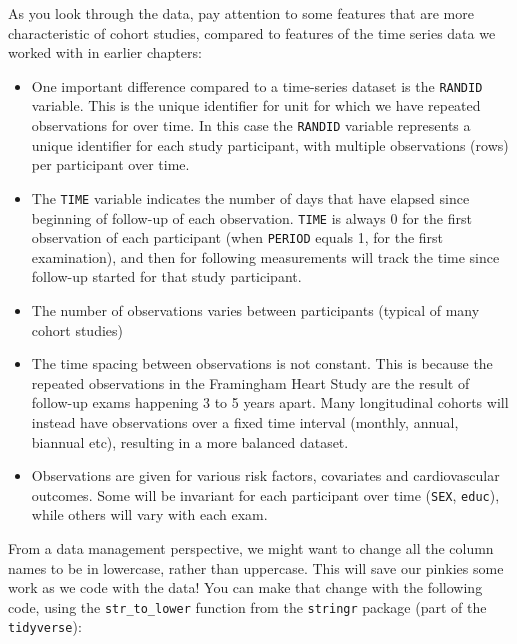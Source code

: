 \documentclass[
]{book}
\newenvironment{Shaded}{\begin{snugshade}}{\end{snugshade}}
\newcommand{\DataTypeTok}[1]{\textcolor[rgb]{0.13,0.29,0.53}{#1}}
\newcommand{\KeywordTok}[1]{\textcolor[rgb]{0.13,0.29,0.53}{\textbf{#1}}}
\newcommand{\NormalTok}[1]{#1}
\newcommand{\OperatorTok}[1]{\textcolor[rgb]{0.81,0.36,0.00}{\textbf{#1}}}
\newcommand{\StringTok}[1]{\textcolor[rgb]{0.31,0.60,0.02}{#1}}
\providecommand{\tightlist}{%
  \setlength{\itemsep}{0pt}\setlength{\parskip}{0pt}}
\begin{document}
As you look through the data, pay attention to some features that are more characteristic of cohort studies, compared to features of the time series data we worked with in earlier chapters:

\begin{itemize}
\tightlist
\item
  One important difference compared to a time-series dataset is the \texttt{RANDID} variable. This is the unique identifier for unit for which we have repeated observations for over time.
  In this case the \texttt{RANDID} variable represents a unique identifier for each study participant, with multiple observations (rows) per participant over time.
\item
  The \texttt{TIME} variable indicates the number of days that have elapsed since beginning of follow-up of each observation. \texttt{TIME} is always 0 for the first observation of each participant (when \texttt{PERIOD} equals 1, for the first examination), and then for following measurements will track the time since follow-up started for that study participant.
\item
  The number of observations varies between participants (typical of many cohort studies)
\item
  The time spacing between observations is not constant. This is because the repeated observations in the Framingham Heart Study are the result of follow-up exams happening 3 to 5 years apart. Many longitudinal cohorts will instead have observations over a fixed time interval (monthly, annual, biannual etc), resulting in a more balanced dataset.
\item
  Observations are given for various risk factors, covariates and cardiovascular outcomes. Some will be invariant for each participant over time (\texttt{SEX}, \texttt{educ}), while others will vary with each exam.
\end{itemize}

From a data management perspective, we might want to change all the column names
to be in lowercase, rather than uppercase. This will save our pinkies some
work as we code with the data! You can make that change with the following
code, using the \texttt{str\_to\_lower} function from the \texttt{stringr} package (part of
the \texttt{tidyverse}):

\begin{Shaded}
\end{Shaded}
\end{document}
